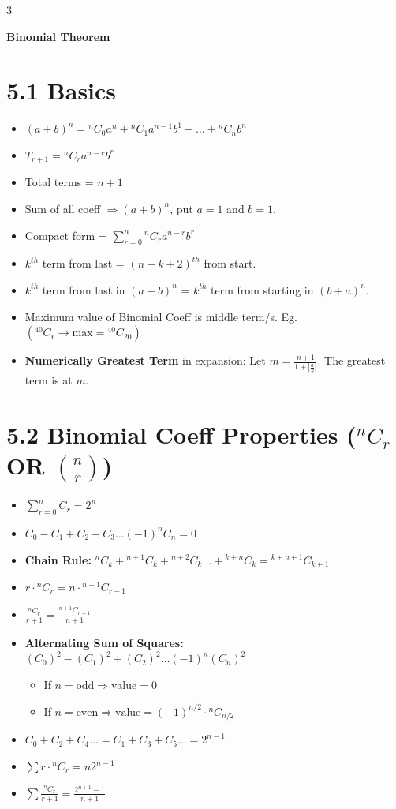 \documentclass[11pt,a4paper,landscape]{article}
\begin{document}
\newpage
\begin{multicols*}{3}

\textbf{\Huge Binomial Theorem}

\section*{5.1 Basics}
\begin{itemize}
\item $(a+b)^n = {}^nC_0 a^n + {}^nC_1 a^{n-1}b^1 + \dots + {}^nC_n b^n$
\item $T_{r+1} = {}^nC_r a^{n-r}b^r$
\item Total terms = $n+1$
\item Sum of all coeff $\Rightarrow (a+b)^n$, put $a=1$ and $b=1$.
\item Compact form = $\sum_{r=0}^n {}^nC_r a^{n-r}b^r$
\item $k^{th}$ term from last = $(n-k+2)^{th}$ from start.
\item $k^{th}$ term from last in $(a+b)^n$ = $k^{th}$ term from starting in $(b+a)^n$.
\item Maximum value of Binomial Coeff is middle term/s. Eg. $({}^{40}C_r \rightarrow \text{max} = {}^{40}C_{20})$
\item \textbf{Numerically Greatest Term} in expansion: Let $m = \frac{n+1}{1 + |\frac{a}{b}|}$. The greatest term is at $m$.
\end{itemize}

\section*{5.2 Binomial Coeff Properties (${}^nC_r$ OR $\binom{n}{r}$)}
\begin{itemize}
\item $\sum_{r=0}^n C_r = 2^n$
\item $C_0 - C_1 + C_2 - C_3 \dots (-1)^n C_n = 0$
\item \textbf{Chain Rule:} ${}^nC_k + {}^{n+1}C_k + {}^{n+2}C_k \dots + {}^{k+n}C_k = {}^{k+n+1}C_{k+1}$
\item $r \cdot {}^nC_r = n \cdot {}^{n-1}C_{r-1}$
\item $\frac{{}^nC_r}{r+1} = \frac{{}^{n+1}C_{r+1}}{n+1}$
\item \textbf{Alternating Sum of Squares:}\\ 
$(C_0)^2 - (C_1)^2 + (C_2)^2 \dots (-1)^n(C_n)^2$
  \begin{itemize}
  \item If $n = \text{odd} \Rightarrow \text{value} = 0$
  \item If $n = \text{even} \Rightarrow \text{value} = (-1)^{n/2} \cdot {}^nC_{n/2}$
  \end{itemize}
\item $C_0 + C_2 + C_4 \dots = C_1 + C_3 + C_5 \dots = 2^{n-1}$
\item $\sum r \cdot {}^nC_r = n 2^{n-1}$
\item $\sum \frac{{}^nC_r}{r+1} = \frac{2^{n+1}-1}{n+1}$
\end{itemize}


\end{multicols*}
\end{document}
